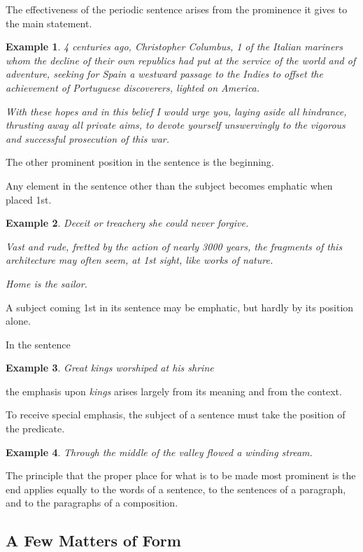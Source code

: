 \documentclass{article}
\newtheorem{example}{Example}
\begin{document}
The effectiveness of the periodic sentence arises from the prominence it gives to the main statement.
\begin{example}
	4 centuries ago, Christopher Columbus, 1 of the Italian mariners whom the decline of their own republics had put at the service of the world and of adventure, seeking for Spain a westward passage to the Indies to offset the achievement of Portuguese discoverers, lighted on America.
	
	With these hopes and in this belief I would urge you, laying aside all hindrance, thrusting away all private aims, to devote yourself unswervingly to the vigorous and successful prosecution of this war.
\end{example}
The other prominent position in the sentence is the beginning.

Any element in the sentence other than the subject becomes emphatic when placed 1st.
\begin{example}
	Deceit or treachery she could never forgive.
	
	Vast and rude, fretted by the action of nearly 3000 years, the fragments of this architecture may often seem, at 1st sight, like works of nature.
	
	Home is the sailor.
\end{example}
A subject coming 1st in its sentence may be emphatic, but hardly by its position alone.

In the sentence
\begin{example}
	Great kings worshiped at his shrine
\end{example}
the emphasis upon {\it kings} arises largely from its meaning and from the context.

To receive special emphasis, the subject of a sentence must take the position of the predicate.
\begin{example}
	Through the middle of the valley flowed a winding stream.
\end{example}
The principle that the proper place for what is to be made most prominent is the end applies equally to the words of a sentence, to the sentences of a paragraph, and to the paragraphs of a composition.


\subsection{A Few Matters of Form}
\end{document}
